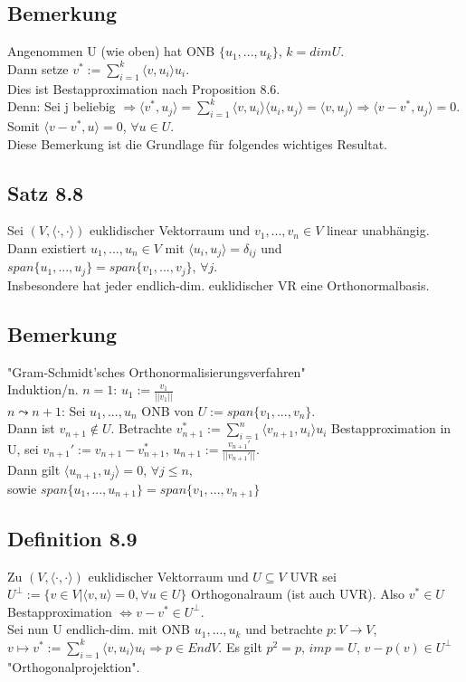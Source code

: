 \documentclass[a4paper, 12pt]{extarticle}
\newcommand{\skalar}[2] {
	\langle #1, #2\rangle
}
\newcommand{\genskalar}{
	\skalar{\cdot }{\cdot }
}
\begin{document}
\subsection*{Bemerkung}
Angenommen U (wie oben) hat ONB $\{u_1,...,u_k\}$, $k = dim U$. \\
Dann setze $v^*:= \sum_{i=1}^k\skalar{v}{u_i}u_i$. \\
Dies ist Bestapproximation nach Proposition 8.6. \\
Denn: Sei j beliebig $\Rightarrow \skalar{v^*}{u_j} = \sum_{i=1}^k\skalar{v}{u_i}\skalar{u_i}{u_j} = \skalar{v}{u_j} \Rightarrow \skalar{v-v^*}{u_j} = 0$.
Somit $\skalar{v-v^*}{u} = 0$, $\forall u \in U$. \\
Diese Bemerkung ist die Grundlage für folgendes wichtiges Resultat.
\subsection*{Satz 8.8}
Sei $(V, \genskalar)$ euklidischer Vektorraum und $v_1,..., v_n \in V$ linear unabhängig. Dann existiert $u_1,...,u_n \in V$ mit $\skalar{u_i}{u_j} = \delta_{ij}$ und $span \{u_1,...,u_j\} = span \{v_1,..., v_j\}$, $\forall j$. \\
Insbesondere hat jeder endlich-dim. euklidischer VR eine Orthonormalbasis.
\subsection*{Bemerkung}
"Gram-Schmidt'sches Orthonormalisierungsverfahren" \\
Induktion/n. $n=1$: $u_1 := \frac{v_1}{||v_1||}$ \\
$n \leadsto n+1$: Sei $u_1,..., u_n$ ONB von $U:=span\{v_1,...,v_n\}$. \\
Dann ist $v_{n+1} \notin U$. Betrachte $v^*_{n+1} := \sum_{i=1}^n \skalar{v_{n+1}}{u_i}u_i$ Bestapproximation in U, sei $v_{n+1}' := v_{n+1} - v^*_{n+1}$, $u_{n+1} := \frac{v_{n+1}'}{||v_{n+1}'||}$. \\
Dann gilt $\skalar{u_{n+1}}{u_j} = 0$, $\forall j \leq n$, \\
sowie $span \{u_1,...,u_{n+1}\} = span \{v_1,...,v_{n+1}\}$
\subsection*{Definition 8.9}
Zu  $(V, \genskalar)$ euklidischer Vektorraum und $U \subseteq V$ UVR sei $U^\perp := \{v\in V| \skalar{v}{u}=0, \forall u\in U\}$ Orthogonalraum (ist auch UVR). Also $v^*\in U$ Bestapproximation $\Leftrightarrow v-v^* \in U^\perp$. \\
Sei nun U endlich-dim. mit ONB $u_1,...,u_k$ und betrachte $p:V\to V$, $v \mapsto v^*:= \sum_{i=1}^k\skalar{v}{u_i}u_i \Rightarrow p\in EndV$. Es gilt $p^2=p$, $imp = U$, $v-p(v)\in U^\perp$ "Orthogonalprojektion".
\end{document}
